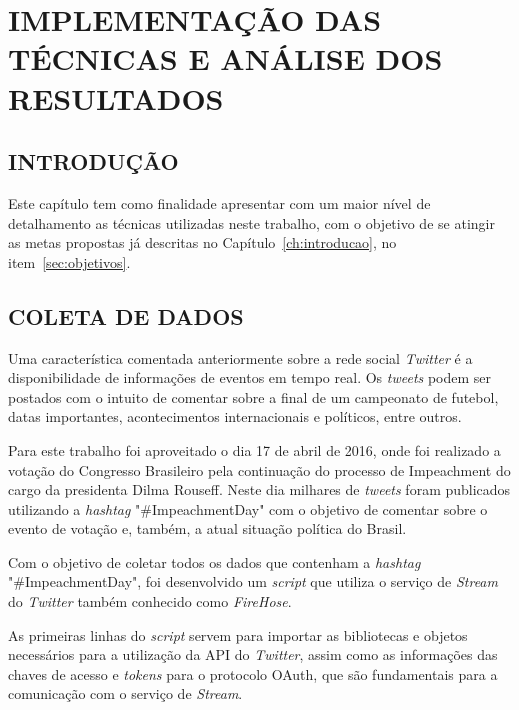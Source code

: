 \chapter{IMPLEMENTAÇÃO DAS TÉCNICAS E ANÁLISE DOS RESULTADOS}\label{ch:implementacao}

\section{INTRODUÇÃO}
Este capítulo tem como finalidade apresentar com um maior nível de detalhamento as técnicas utilizadas neste trabalho, com o objetivo de se atingir as metas propostas já descritas no Capítulo~\ref{ch:introducao}, no item~\ref{sec:objetivos}.

\section{COLETA DE DADOS}
Uma característica comentada anteriormente sobre a rede social \textit{Twitter} é a disponibilidade de informações de eventos em tempo real. Os \textit{tweets} podem ser postados com o intuito de comentar sobre a final de um campeonato de futebol, datas importantes, acontecimentos internacionais e políticos, entre outros.

Para este trabalho foi aproveitado o dia 17 de abril de 2016, onde foi realizado a votação do Congresso Brasileiro pela continuação do processo de Impeachment do cargo da presidenta Dilma Rouseff. Neste dia milhares de \textit{tweets} foram publicados utilizando a \textit{hashtag} "\#ImpeachmentDay" \space com o objetivo de comentar sobre o evento de votação e, também, a atual situação política do Brasil.

Com o objetivo de coletar todos os dados que contenham a \textit{hashtag} "\#ImpeachmentDay", foi desenvolvido um \textit{script} que utiliza o serviço de \textit{Stream} do \textit{Twitter} também conhecido como \textit{FireHose}.

As primeiras linhas do \textit{script} servem para importar as bibliotecas e objetos necessários para a utilização da API do \textit{Twitter}, assim como as informações das chaves de acesso e \textit{tokens} para o protocolo OAuth, que são fundamentais para a comunicação com o serviço de \textit{Stream}. \\


